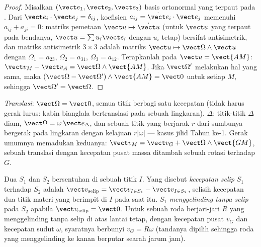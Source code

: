 \begin{proof}
Misalkan $(\vect e_1, \vect e_2, \vect e_3)$ basis ortonormal yang terpaut
pada . Dari $\vect e_i\cdot\vect e_j = \delta_{ij}$, koefisien
$a_{ij} = \dot{\vect e}_i\cdot\vect e_j$ memenuhi $a_{ij} + a_{ji} = 0$:
matriks pemetaan $\vect u \mapsto \dot{\vect u}$ (untuk $\vect u$ yang
terpaut pada bendanya, $\vect u = \sum u_i\vect e_i$ dengan $u_i$ tetap)
bersifat antisimetrik, dan matriks antisimetrik $3\times3$ adalah matriks
$\vect u \mapsto \vect\Omega\wedge\vect u$ dengan $\Omega_1 = a_{23}$,
$\Omega_2 = a_{31}$, $\Omega_3 = a_{12}$. Terapkanlah pada $\vect u =
\vect{AM}$: $\vect v_M - \vect v_A = \vect\Omega\wedge\vect{AM}$. Jika
$\vect\Omega'$ melakukan hal yang sama, maka $(\vect\Omega - \vect\Omega')\wedge
\vect{AM} = \vect 0$ untuk setiap $M$, sehingga $\vect\Omega' = \vect\Omega$.
\end{proof}

\begin{remark}\label{rem:b2:rigid-body-mechanics:motions}
\emph{Translasi}: $\vect\Omega = \vect 0$, semua titik berbagi satu
kecepatan (tidak harus gerak lurus: kabin bianglala bertranslasi pada
sebuah lingkaran). \emph{} $\Delta$:
titik-titik $\Delta$ diam, $\vect\Omega = \omega\,\vect e_\Delta$, dan
sebuah titik yang berjarak $r$ dari sumbunya bergerak pada lingkaran
dengan kelajuan $r|\omega|$ --- kasus jilid Tahun ke-1. Gerak umumnya
memadukan keduanya: $\vect v_M = \vect v_G + \vect\Omega\wedge\vect{GM}$,
sebuah translasi dengan kecepatan pusat massa ditambah sebuah rotasi
terhadap $G$.
\end{remark}

\begin{definition}\label{def:b2:rigid-body-mechanics:rolling}
Dua  $S_1$ dan $S_2$ bersentuhan di sebuah titik $I$. Yang
disebut \emph{kecepatan selip} $S_1$ terhadap $S_2$ adalah $\vect v_{\text{selip}} = \vect v_{I \in S_1}
- \vect v_{I \in S_2}$, selisih kecepatan dua titik materi yang berimpit
di $I$ pada saat itu. $S_1$ \emph{menggelinding tanpa selip} pada $S_2$
apabila $\vect v_{\text{selip}} = \vect 0$. Untuk sebuah roda berjari-jari
$R$ yang menggelinding tanpa selip di atas lantai tetap, dengan kecepatan
pusat $v_G$ dan kecepatan sudut $\omega$, syaratnya berbunyi
$v_G = R\omega$ (tandanya dipilih sehingga roda yang menggelinding ke
kanan berputar searah jarum jam).
\end{definition}

